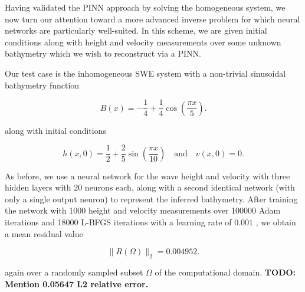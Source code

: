 Having validated the PINN approach by solving the homogeneous system, we now turn our attention toward a more advanced
inverse problem for which neural networks are particularly well-suited. In this scheme, we are given initial conditions 
along with height and velocity measurements over some unknown bathymetry which we wish to reconstruct via a PINN. 

Our test case is the inhomogeneous SWE system with a non-trivial sinusoidal bathymetry function

$$
B(x) = -\frac{1}{4} + \frac{1}{4} \cos{\left( \frac{\pi x}{5} \right)}.
$$

\noindent along with initial conditions

$$
h(x, 0) = \frac{1}{2} + \frac{2}{5} \sin{\left( \frac{\pi x}{10} \right)} \quad \text{and} \quad v(x, 0) = 0.
$$

As before, we use a neural network for the wave height and velocity with three hidden layers with 20 neurons each, along
with a second identical network (with only a single output neuron) to represent the inferred bathymetry. After training 
the network with 1000 height and velocity measurements over 100000 Adam iterations and 18000 L-BFGS iterations with a 
learning rate of $0.001$ , we obtain a mean residual value

$$
\lVert R(\Omega) \rVert_2 = 0.004952.
$$

\noindent again over a randomly sampled subset $\Omega$ of the computational domain. 
\textbf{TODO: Mention 0.05647 L2 relative error.}

